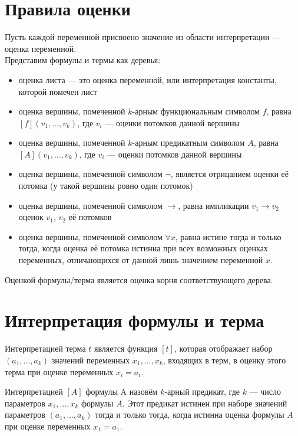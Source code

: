 \documentclass[11pt]{article}
\begin{document}
\section{Правила оценки}
Пусть каждой переменной присвоено значение из области интерпретации --- оценка переменной. \\
Представим формулы и термы как деревья:
\begin{itemize}
    \item оценка листа --- это оценка переменной, или интерпретация константы, которой помечен лист
    \item оценка вершины, помеченной $k$-арным функциональным символом $f$, равна 
    $[f](v_1, \dots, v_k)$, где $v_i$ --- оценки потомков данной вершины
    \item оценка вершины, помеченной $k$-арным предикатным символом $A$, равна
    $[A](v_1, \dots, v_k)$, где $v_i$ --- оценки потомков данной вершины
    \item оценка вершины, помеченной символом $\lnot$, является отрицанием оценки её
    потомка (у такой вершины ровно один потомок)
    \item оценка вершины, помеченной символом $\to$, равна импликации $v_1 \to v_2$
    оценок $v_1$, $v_2$ её потомков
    \item оценка вершины, помеченной символом $\forall x$, равна истине тогда и только тогда,
    когда оценка её потомка истинна при всех возможных оценках переменных, отличающихся от 
    данной лишь значением переменной $x$.
\end{itemize}

\begin{definition}
    Оценкой формулы/терма является оценка корня соответствующего дерева.
\end{definition}

\section{Интерпретация формулы и терма}

\begin{definition}
    Интерпретацией терма $t$ является функция $[t]$, которая отображает набор $(a_1, \dots, a_k)$
    значений переменных $x_1, \dots, x_k$, входящих в терм, в оценку этого терма 
    при оценке переменных $x_i = a_i$.
\end{definition}

\begin{definition}
    Интерпретацией $[A]$ формулы A назовём $k$-арный предикат, где $k$ --- число
    параметров $x_1, \dots, x_k$ формулы $A$. Этот предикат истинен при наборе 
    значений параметров $(a_1, \dots, a_k)$  тогда и только тогда, когда истинна 
    оценка формулы $A$ при оценке переменных $x_1 = a_1$.
\end{definition}
\end{document}

